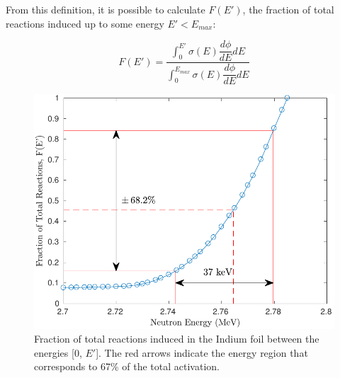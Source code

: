 \documentclass[5p]{elsarticle}
\newcommand{\pp}[1]{\left( #1\right)}
\newcommand{\comment}[1]{\todo[color=blue!20!white,inline]{ASV: #1}}
\begin{document}

From this definition, it is possible to calculate $F\pp{E'}$, the fraction of total reactions induced up to some energy $E' < E_{max}$:

\begin{equation}\label{eqn:react_fraction}
F\pp{E'} = \dfrac{\int_0^{E'} \sigma(E) \dfrac{d\phi}{dE} dE}{\int_0^{E_{max}} \sigma(E) \dfrac{d\phi}{dE} dE}
\end{equation}




\begin{figure}
 \centering
 \includegraphics[scale=0.6]{./figures/fracplot_new.pdf}
 \caption{Fraction of total reactions induced in the Indium foil between the energies [0, $E'$]. The red arrows indicate the energy region that corresponds to 67\% of the total activation.}
 \label{fig:frac_plot}
\end{figure}
\end{document}
